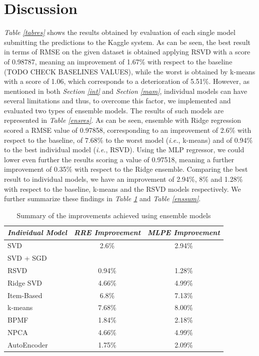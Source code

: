 \documentclass[10pt,conference,compsocconf]{IEEEtran}
\begin{document}
\section{Discussion}
\label{disc}

\emph{Table \ref{tabres}} shows the results obtained by evaluation of each single model submitting the predictions to the Kaggle system. As can be seen, the best result in terms of RMSE on the given dataset is obtained applying RSVD with a score of 0.98787, meaning an improvement of 1.67\% with respect to the baseline (TODO CHECK BASELINES VALUES), while the worst is obtained by k-means with a score of 1.06, which corresponds to a deterioration of 5.51\%. However, as mentioned in both \emph{Section \ref{int}} and \emph{Section \ref{mam}}, individual models can have several limitations and thus, to overcome this factor, we implemented and evaluated two types of ensemble models. The results of such models are represented in \emph{Table \ref{ensres}}. As can be seen, ensemble with Ridge regression scored a RMSE value of 0.97858, corresponding to an improvement of 2.6\% with respect to the baseline, of 7.68\% to the worst model (\emph{i.e.}, k-means) and of 0.94\% to the best individual model (\emph{i.e.}, RSVD). Using the MLP regressor, we could lower even further the results scoring a value of 0.97518, meaning a further improvement of 0.35\% with respect to the Ridge ensemble. Comparing the best result to individual models, we have an improvement of 2.94\%, 8\% and 1.28\% with respect to the baseline, k-means and the RSVD models respectively. We further summarize these findings in \emph{Table \ref{sumtab}} and \emph{Table \ref{enssum}}.

\begin{table}[h!] 
	\centering
	\begin{tabular}{l|c|c}
		\textit{\textbf{Individual Model}} & \textit{\textbf{RRE Improvement}} & \textit{\textbf{MLPE Improvement}} \\
		\hline
		SVD                     &       2.6\%     &     2.94\%         \\
		SVD + SGD               &                 &      				 \\
		RSVD       	            &        0.94\%  &     1.28\%         		\\
		Ridge SVD               &        4.66\%   &    4.99\%         		\\
		Item-Based              &        6.8\%     &   7.13\%        		\\
		k-means                 &        7.68\%     &  8.00\%         		\\
		BPMF                    &        1.84\%  &     2.18\%        \\
		NPCA                    &        4.66\%   &    4.99\%   				\\
		AutoEncoder             &        1.75\%    &   2.09\%        
	\end{tabular}
    \caption{Summary of the improvements achieved using ensemble models}
    \label{sumtab}
\end{table}
\end{document}
